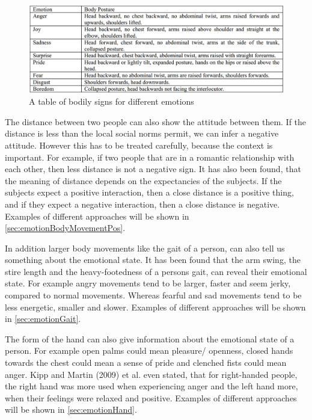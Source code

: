 \documentclass[conference]{IEEEtran}
\begin{document}
\begin{figure}[H]
\centering
   \includegraphics[width=\linewidth]{bodyPostureTable.jpg}
  \caption{A table of bodily signs for different emotions\cite{singhsignificance}}
  \label{fig:bodyPostureTable}
\end{figure}
The distance between two people can also show the attitude between them. If the distance is less than the local social norms permit, we can infer a negative attitude\cite{mehrabian1969significance}. However this has to be treated carefully, because the context is important. For example, if two people that are in a romantic relationship with each other, then less distance is not a negative sign. It has also been found, that the meaning of distance depends on the expectancies of the subjects. If the subjects expect a positive interaction, then a close distance is a positive thing, and if they expect a negative interaction, then a close distance is negative\cite{mehrabian1969significance}. Examples of different approaches will be shown in \autoref{sec:emotionBodyMovementPos}.\

In addition larger body movements like the gait of a person, can also tell us something about the emotional state. It has been found that the arm swing, the stire length and the heavy-footedness of a persons gait, can reveal their emotional state\cite{montepare1987identification}. For example angry movements tend to be larger, faster and seem jerky, compared to normal movements\cite{singhsignificance}. Whereas fearful and sad movements tend to be less energetic, smaller and slower\cite{singhsignificance}. Examples of different approaches will be shown in \autoref{sec:emotionGait}.\


The form of the hand can also give information about the emotional state of a person. For example open palms could mean pleasure/ openness, closed hands towards the chest could mean a sense of pride and clenched fists could mean anger\cite{beale2008affect,singh2015edbl}. Kipp and Martin (2009) et al.\cite{kipp2009gesture} even stated, that for right-handed people, the right hand was more used when experiencing anger and the left hand more, when their feelings were relaxed and positive. Examples of different approaches will be shown in \autoref{sec:emotionHand}.
\end{document}
